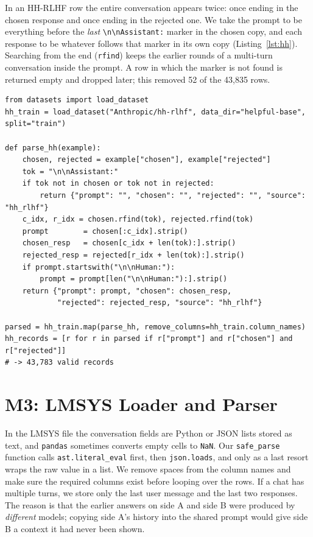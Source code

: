 In an HH-RLHF row the entire conversation appears twice: once ending in the chosen response and once ending in the rejected one. We take the prompt to be everything before the \emph{last} \verb|\n\nAssistant:| marker in the chosen copy, and each response to be whatever follows that marker in its own copy (Listing~\ref{lst:hh}). Searching from the end (\texttt{rfind}) keeps the earlier rounds of a multi-turn conversation inside the prompt. A row in which the marker is not found is returned empty and dropped later; this removed 52 of the 43,835 rows.

\begin{lstlisting}[caption={Parsing HH-RLHF dialogues into the common schema.}, label={lst:hh}]
from datasets import load_dataset
hh_train = load_dataset("Anthropic/hh-rlhf", data_dir="helpful-base", split="train")

def parse_hh(example):
    chosen, rejected = example["chosen"], example["rejected"]
    tok = "\n\nAssistant:"
    if tok not in chosen or tok not in rejected:
        return {"prompt": "", "chosen": "", "rejected": "", "source": "hh_rlhf"}
    c_idx, r_idx = chosen.rfind(tok), rejected.rfind(tok)
    prompt        = chosen[:c_idx].strip()
    chosen_resp   = chosen[c_idx + len(tok):].strip()
    rejected_resp = rejected[r_idx + len(tok):].strip()
    if prompt.startswith("\n\nHuman:"):
        prompt = prompt[len("\n\nHuman:"):].strip()
    return {"prompt": prompt, "chosen": chosen_resp,
            "rejected": rejected_resp, "source": "hh_rlhf"}

parsed = hh_train.map(parse_hh, remove_columns=hh_train.column_names)
hh_records = [r for r in parsed if r["prompt"] and r["chosen"] and r["rejected"]]
# -> 43,783 valid records
\end{lstlisting}

\section{M3: LMSYS Loader and Parser}
\label{sec:m3}

In the LMSYS file the conversation fields are Python or JSON lists stored as text, and \texttt{pandas} sometimes converts empty cells to \texttt{NaN}. Our \texttt{safe\_parse} function calls \texttt{ast.literal\_eval} first, then \texttt{json.loads}, and only as a last resort wraps the raw value in a list. We remove spaces from the column names and make sure the required columns exist before looping over the rows. If a chat has multiple turns, we store only the last user message and the last two responses. The reason is that the earlier answers on side A and side B were produced by \emph{different} models; copying side A's history into the shared prompt would give side B a context it had never been shown.

